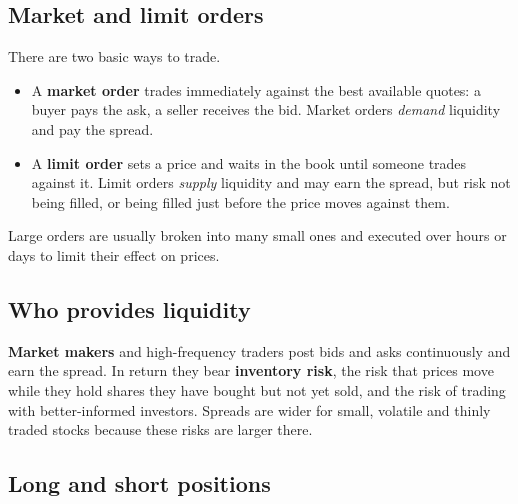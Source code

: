 
\subsection{Market and limit orders}

There are two basic ways to trade.

\begin{itemize}
  \item A \textbf{market order} trades immediately against the best available quotes: a buyer pays the ask, a seller receives the bid. Market orders \emph{demand} liquidity and pay the spread.
  \item A \textbf{limit order} sets a price and waits in the book until someone trades against it. Limit orders \emph{supply} liquidity and may earn the spread, but risk not being filled, or being filled just before the price moves against them.
\end{itemize}

Large orders are usually broken into many small ones and executed over hours or days to limit their effect on prices.

\subsection{Who provides liquidity}

\textbf{Market makers} and high-frequency traders post bids and asks continuously and earn the spread. In return they bear \textbf{inventory risk}, the risk that prices move while they hold shares they have bought but not yet sold, and the risk of trading with better-informed investors. Spreads are wider for small, volatile and thinly traded stocks because these risks are larger there.

\subsection{Long and short positions}

